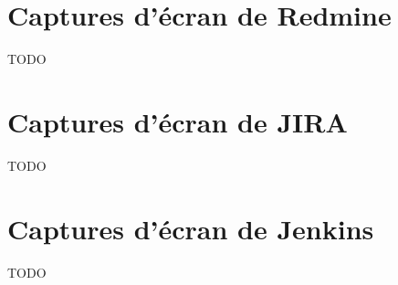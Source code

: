 \appendix

\chapter{Captures d'écran de Redmine}
\label{annexe:redmine}

TODO


\chapter{Captures d'écran de JIRA}
\label{annexe:jira}

TODO


\chapter{Captures d'écran de Jenkins}
\label{annexe:jenkins}

TODO

